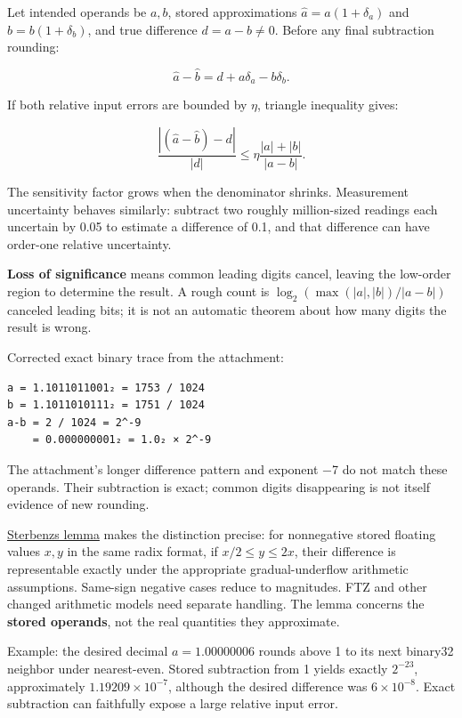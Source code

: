 Let intended operands be \(a,b\), stored approximations \(\widehat a=a(1+\delta_a)\) and \(\widehat b=b(1+\delta_b)\), and true difference \(d=a-b\ne0\). Before any final subtraction rounding:

\[
\widehat a-\widehat b=d+a\delta_a-b\delta_b.
\]

If both relative input errors are bounded by \(\eta\), triangle inequality gives:

\[
\frac{|(\widehat a-\widehat b)-d|}{|d|}
\le\eta\frac{|a|+|b|}{|a-b|}.
\]

The sensitivity factor grows when the denominator shrinks. Measurement uncertainty behaves similarly: subtract two roughly million-sized readings each uncertain by 0.05 to estimate a difference of 0.1, and that difference can have order-one relative uncertainty.

\textbf{Loss of significance} means common leading digits cancel, leaving the low-order region to determine the result. A rough count is \(\log_2(\max(|a|,|b|)/|a-b|)\) canceled leading bits; it is not an automatic theorem about how many digits the result is wrong.

Corrected exact binary trace from the attachment:

\begin{verbatim}
a = 1.1011011001₂ = 1753 / 1024
b = 1.1011010111₂ = 1751 / 1024
a-b = 2 / 1024 = 2^-9
    = 0.000000001₂ = 1.0₂ × 2^-9
\end{verbatim}

The attachment's longer difference pattern and exponent −7 do not match these operands. Their subtraction is exact; common digits disappearing is not itself evidence of new rounding.

\hyperref[appendix-399b7ad53f39]{Sterbenz\textquotesingle s lemma} makes the distinction precise: for nonnegative stored floating values \(x,y\) in the same radix format, if \(x/2\le y\le2x\), their difference is representable exactly under the appropriate gradual-underflow arithmetic assumptions. Same-sign negative cases reduce to magnitudes. FTZ and other changed arithmetic models need separate handling. The lemma concerns the \textbf{stored operands}, not the real quantities they approximate.

Example: the desired decimal \(a=1.00000006\) rounds above 1 to its next binary32 neighbor under nearest-even. Stored subtraction from 1 yields exactly \(2^{-23}\), approximately \(1.19209\times10^{-7}\), although the desired difference was \(6\times10^{-8}\). Exact subtraction can faithfully expose a large relative input error.

